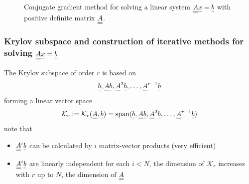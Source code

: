 

\begin{figure}[H]
    \centering
    
    \caption{Conjugate gradient method for solving a linear system $\mat{A}\vec{x} = \vec{b}$ with positive definite matrix $\mat{A}$.}
    \label{fig:conjugate_gradient}
\end{figure}

\subsubsection{Krylov subspace and construction of iterative methods for solving $\mat{A}\vec{x} = \vec{b}$}
The Krylov subspace of order $r$ is based on
\begin{equation}
    \vec{b}, \mat{A}\vec{b}, \mat{A}^2\vec{b}, \dots, \mat{A}^{r-1}\vec{b}
\end{equation}
forming a linear vector space
\begin{equation}
    \mathcal{K}_r := \mathcal{K}_r(\mat{A},\vec{b}) = \text{span} {(\vec{b}, \mat{A}\vec{b}, \mat{A}^2\vec{b}, \dots, \mat{A}^{r-1}\vec{b})}
\end{equation}
note that
\begin{itemize}
    \item $\mat{A}^i \vec{b}$ can be calculated by $i$ matrix-vector products (very efficient)
    \item $\mat{A}^i \vec{b}$ are linearly independent for each $i < N$, the dimension of $\mathcal{K}_r$ increases with $r$ up to $N$, the dimension of $\mat{A}$
\end{itemize}
